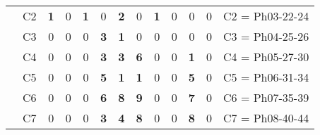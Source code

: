 \begin{table}[H]
{\begin{tabular}{|ccrrrrrrrrrrc|}
\multicolumn{1}{|c|}{}                                      & \multicolumn{1}{c|}{C2} & \multicolumn{1}{c|}{\textbf{1}} & \multicolumn{1}{c|}{0}  & \multicolumn{1}{c|}{\textbf{1}} & \multicolumn{1}{c|}{0}          & \multicolumn{1}{c|}{\textbf{2}}  & \multicolumn{1}{c|}{0}           & \multicolumn{1}{c|}{\textbf{1}} & \multicolumn{1}{c|}{0}  & \multicolumn{1}{c|}{0}           & \multicolumn{1}{c|}{0}          & C2 = Ph03-22-24   \\ \cline{2-13}
\multicolumn{1}{|c|}{}                                      & \multicolumn{1}{c|}{C3} & \multicolumn{1}{c|}{0}          & \multicolumn{1}{c|}{0}  & \multicolumn{1}{c|}{0}          & \multicolumn{1}{c|}{\textbf{3}} & \multicolumn{1}{c|}{\textbf{1}}  & \multicolumn{1}{c|}{0}           & \multicolumn{1}{c|}{0}          & \multicolumn{1}{c|}{0}  & \multicolumn{1}{c|}{0}           & \multicolumn{1}{c|}{0}          & C3 = Ph04-25-26   \\ \cline{2-13}
\multicolumn{1}{|c|}{}                                      & \multicolumn{1}{c|}{C4} & \multicolumn{1}{c|}{0}          & \multicolumn{1}{c|}{0}  & \multicolumn{1}{c|}{0}          & \multicolumn{1}{c|}{\textbf{3}} & \multicolumn{1}{c|}{\textbf{3}}  & \multicolumn{1}{c|}{\textbf{6}}  & \multicolumn{1}{c|}{0}          & \multicolumn{1}{c|}{0}  & \multicolumn{1}{c|}{\textbf{1}}  & \multicolumn{1}{c|}{0}          & C4 = Ph05-27-30   \\ \cline{2-13}
\multicolumn{1}{|c|}{}                                      & \multicolumn{1}{c|}{C5} & \multicolumn{1}{c|}{0}          & \multicolumn{1}{c|}{0}  & \multicolumn{1}{c|}{0}          & \multicolumn{1}{c|}{\textbf{5}} & \multicolumn{1}{c|}{\textbf{1}}  & \multicolumn{1}{c|}{\textbf{1}}  & \multicolumn{1}{c|}{0}          & \multicolumn{1}{c|}{0}  & \multicolumn{1}{c|}{\textbf{5}}  & \multicolumn{1}{c|}{0}          & C5 = Ph06-31-34   \\ \cline{2-13}
\multicolumn{1}{|c|}{}                                      & \multicolumn{1}{c|}{C6} & \multicolumn{1}{c|}{0}          & \multicolumn{1}{c|}{0}  & \multicolumn{1}{c|}{0}          & \multicolumn{1}{c|}{\textbf{6}} & \multicolumn{1}{c|}{\textbf{8}}  & \multicolumn{1}{c|}{\textbf{9}}  & \multicolumn{1}{c|}{0}          & \multicolumn{1}{c|}{0}  & \multicolumn{1}{c|}{\textbf{7}}  & \multicolumn{1}{c|}{0}          & C6 = Ph07-35-39   \\ \cline{2-13}
\multicolumn{1}{|c|}{}                                      & \multicolumn{1}{c|}{C7} & \multicolumn{1}{c|}{0}          & \multicolumn{1}{c|}{0}  & \multicolumn{1}{c|}{0}          & \multicolumn{1}{c|}{\textbf{3}} & \multicolumn{1}{c|}{\textbf{4}}  & \multicolumn{1}{c|}{\textbf{8}}  & \multicolumn{1}{c|}{0}          & \multicolumn{1}{c|}{0}  & \multicolumn{1}{c|}{\textbf{8}}  & \multicolumn{1}{c|}{0}          & C7 = Ph08-40-44   \\ \cline{2-13}

\end{tabular}}
\end{table}
